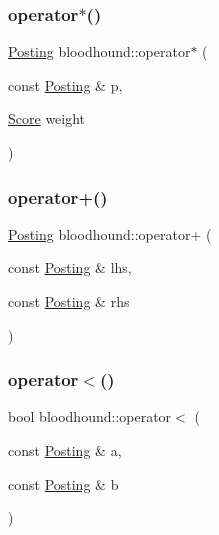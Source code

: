 \subsubsection{\texorpdfstring{operator$\ast$()}{operator*()}}
{\footnotesize\ttfamily \mbox{\hyperlink{structbloodhound_1_1Posting}{Posting}} bloodhound\+::operator$\ast$ (\begin{DoxyParamCaption}\item[{const \mbox{\hyperlink{structbloodhound_1_1Posting}{Posting}} \&}]{p,  }\item[{\mbox{\hyperlink{structbloodhound_1_1Score}{Score}}}]{weight }\end{DoxyParamCaption})}

\mbox{\label{namespacebloodhound_a0b07d73bf298a56b219b270d5fa70b83}} 
\subsubsection{\texorpdfstring{operator+()}{operator+()}}
{\footnotesize\ttfamily \mbox{\hyperlink{structbloodhound_1_1Posting}{Posting}} bloodhound\+::operator+ (\begin{DoxyParamCaption}\item[{const \mbox{\hyperlink{structbloodhound_1_1Posting}{Posting}} \&}]{lhs,  }\item[{const \mbox{\hyperlink{structbloodhound_1_1Posting}{Posting}} \&}]{rhs }\end{DoxyParamCaption})}

\mbox{\label{namespacebloodhound_ae20cf3f97304dde56dd526eaa08c41dc}} 
\subsubsection{\texorpdfstring{operator$<$()}{operator<()}}
{\footnotesize\ttfamily bool bloodhound\+::operator$<$ (\begin{DoxyParamCaption}\item[{const \mbox{\hyperlink{structbloodhound_1_1Posting}{Posting}} \&}]{a,  }\item[{const \mbox{\hyperlink{structbloodhound_1_1Posting}{Posting}} \&}]{b }\end{DoxyParamCaption})}

